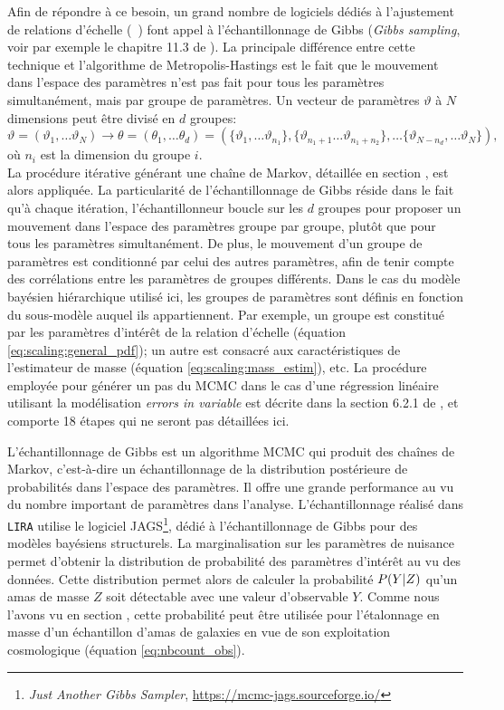 Afin de répondre à ce besoin, un grand nombre de logiciels dédiés à l'ajustement de relations d'échelle (\eg\ \cite{sereno_bayesian_2016, mantz_gibbs_2016}) font appel à l'échantillonnage de Gibbs (\textit{Gibbs sampling}, voir par exemple le chapitre 11.3 de \cite{gelman_bayesian_2013}).
La principale différence entre cette technique et l'algorithme de Metropolis-Hastings est le fait que le mouvement dans l'espace des paramètres n'est pas fait pour tous les paramètres simultanément, mais par groupe de paramètres.
Un vecteur de paramètres $\vartheta$ à $N$ dimensions peut être divisé en $d$ groupes:
\begin{equation}
    \vartheta = (\vartheta_1, \dots \vartheta_N)
    \rightarrow \theta = (\theta_1, \dots \theta_d)
    = (\{\vartheta_1, \dots \vartheta_{n_1}\}, \{\vartheta_{n_1 + 1} \dots \vartheta_{n_1 + n_2}\}, \dots \{\vartheta_{N - n_d}, \dots \vartheta_N\}),
\end{equation}
où $n_i$ est la dimension du groupe $i$. \\
La procédure itérative générant une chaîne de Markov, détaillée en section , est alors appliquée.
La particularité de l'échantillonnage de Gibbs réside dans le fait qu'à chaque itération, l'échantillonneur boucle sur les $d$ groupes pour proposer un mouvement dans l'espace des paramètres groupe par groupe, plutôt que pour tous les paramètres simultanément.
De plus, le mouvement d'un groupe de paramètres est conditionné par celui des autres paramètres, afin de tenir compte des corrélations entre les paramètres de groupes différents.
Dans le cas du modèle bayésien hiérarchique utilisé ici, les groupes de paramètres sont définis en fonction du sous-modèle auquel ils appartiennent.
Par exemple, un groupe est constitué par les paramètres d'intérêt de la relation d'échelle (équation \ref{eq:scaling:general_pdf}); un autre est consacré aux caractéristiques de l'estimateur de masse (équation \ref{eq:scaling:mass_estim}), etc.
La procédure employée pour générer un pas du MCMC dans le cas d'une régression linéaire utilisant la modélisation \textit{errors in variable} est décrite dans la section 6.2.1 de \cite{kelly_aspects_2007}, et comporte 18 étapes qui ne seront pas détaillées ici.

L'échantillonnage de Gibbs est un algorithme MCMC qui produit des chaînes de Markov, c'est-à-dire un échantillonnage de la distribution postérieure de probabilités dans l'espace des paramètres.
Il offre une grande performance au vu du nombre important de paramètres dans l'analyse.
L'échantillonnage réalisé dans \texttt{LIRA} utilise le logiciel JAGS\footnote{\textit{Just Another Gibbs Sampler}, \url{https://mcmc-jags.sourceforge.io/}}, dédié à l'échantillonnage de Gibbs pour des modèles bayésiens structurels.
La marginalisation sur les paramètres de nuisance permet d'obtenir la distribution de probabilité des paramètres d'intérêt au vu des données.
Cette distribution permet alors de calculer la probabilité $P({Y|Z})$ qu'un amas de masse $Z$ soit détectable avec une valeur d'observable $Y$.
Comme nous l'avons vu en section , cette probabilité peut être utilisée pour l'étalonnage en masse d'un échantillon d'amas de galaxies en vue de son exploitation cosmologique (équation \ref{eq:nbcount_obs}).

